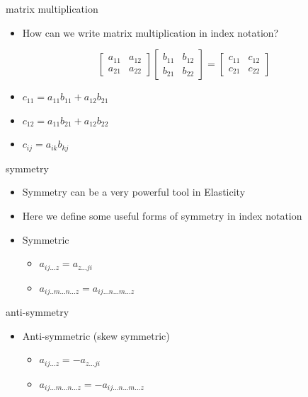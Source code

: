 \documentclass[
  letterpaper,
  ignorenonframetext,
  aspectratio=43,
  handout,
  12pt]{beamer}
\providecommand{\tightlist}{%
  \setlength{\itemsep}{0pt}\setlength{\parskip}{0pt}}
\providecommand{\tightlist}{%
\setlength{\itemsep}{0pt}\setlength{\parskip}{0pt}}
\begin{document}
\begin{frame}{matrix multiplication}
\protect\hypertarget{matrix-multiplication}{}
\begin{itemize}
\tightlist
\item
  How can we write matrix multiplication in index notation?
\end{itemize}

\[\begin{bmatrix}
    a_{11} & a_{12} \\
    a_{21} & a_{22}
\end{bmatrix}
\begin{bmatrix}
    b_{11} & b_{12} \\
    b_{21} & b_{22}
\end{bmatrix} =
\begin{bmatrix}
    c_{11} & c_{12} \\
    c_{21} & c_{22}
\end{bmatrix}\]

\begin{itemize}
\item
  \(c_{11} = a_{11}b_{11} + a_{12}b_{21}\)
\item
  \(c_{12} = a_{11}b_{21} + a_{12}b_{22}\)
\item
  \(c_{ij} = a_{ik}b_{kj}\)
\end{itemize}
\end{frame}

\begin{frame}{symmetry}
\protect\hypertarget{symmetry}{}
\begin{itemize}
\tightlist
\item
  Symmetry can be a very powerful tool in Elasticity
\item
  Here we define some useful forms of symmetry in index notation
\item
  Symmetric

  \begin{itemize}
  \tightlist
  \item
    \(a_{ij ... z} = a_{z ... ji}\)
  \item
    \(a_{ij .. m ... n ... z} = a_{ij ... n ... m ... z}\)
  \end{itemize}
\end{itemize}
\end{frame}

\begin{frame}{anti-symmetry}
\protect\hypertarget{anti-symmetry}{}
\begin{itemize}
\tightlist
\item
  Anti-symmetric (skew symmetric)

  \begin{itemize}
  \tightlist
  \item
    \(a_{ij ... z} = -a_{z ... ji}\)
  \item
    \(a_{ij ... m ... n ... z} = -a_{ij ... n ... m ... z}\)
  \end{itemize}
\end{itemize}
\end{frame}
\end{document}
